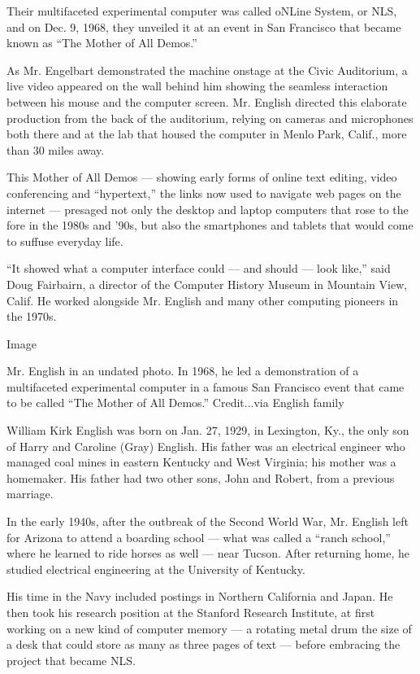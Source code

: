 Their multifaceted experimental computer was called oNLine System, or
NLS, and on Dec. 9, 1968, they unveiled it at an event in San Francisco
that became known as ``The Mother of All Demos.''

As Mr. Engelbart demonstrated the machine onstage at the Civic
Auditorium, a live video appeared on the wall behind him showing the
seamless interaction between his mouse and the computer screen. Mr.
English directed this elaborate production from the back of the
auditorium, relying on cameras and microphones both there and at the lab
that housed the computer in Menlo Park, Calif., more than 30 miles away.

This Mother of All Demos --- showing early forms of online text editing,
video conferencing and ``hypertext,'' the links now used to navigate web
pages on the internet --- presaged not only the desktop and laptop
computers that rose to the fore in the 1980s and '90s, but also the
smartphones and tablets that would come to suffuse everyday life.

``It showed what a computer interface could --- and should --- look
like,'' said Doug Fairbairn, a director of the Computer History Museum
in Mountain View, Calif. He worked alongside Mr. English and many other
computing pioneers in the 1970s.

Image

Mr. English in an undated photo. In 1968, he led a demonstration of a
multifaceted experimental computer in a famous San Francisco event that
came to be called ``The Mother of All Demos.'' Credit...via English
family

William Kirk English was born on Jan. 27, 1929, in Lexington, Ky., the
only son of Harry and Caroline (Gray) English. His father was an
electrical engineer who managed coal mines in eastern Kentucky and West
Virginia; his mother was a homemaker. His father had two other sons,
John and Robert, from a previous marriage.

In the early 1940s, after the outbreak of the Second World War, Mr.
English left for Arizona to attend a boarding school --- what was called
a ``ranch school,'' where he learned to ride horses as well --- near
Tucson. After returning home, he studied electrical engineering at the
University of Kentucky.

His time in the Navy included postings in Northern California and Japan.
He then took his research position at the Stanford Research Institute,
at first working on a new kind of computer memory --- a rotating metal
drum the size of a desk that could store as many as three pages of text
--- before embracing the project that became NLS.

